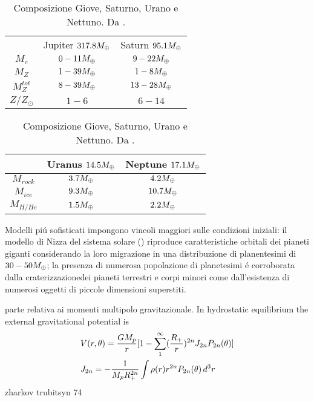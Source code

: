 \begin{table}[!htb]
    \begin{minipage}{.5\linewidth}
      \centering
        \begin{tabular}{|ccc|}
\hline
&\parbox{1.5cm}{Jupiter $317.8M_{\oplus}{}$}&\parbox{1.5cm}{Saturn $95.1M_{\oplus}{}$}\\
  $M_c$&$0-11M_{\oplus}{}$&$9-22M_{\oplus}{}$\\
\hline
$M_Z$&$1-39M_{\oplus}{}$&$1-8M_{\oplus}{}$\\
\hline
$M_Z^{tot}$&$8-39M_{\oplus}{}$&$13-28M_{\oplus}{}$\\
\hline
$Z/Z_{\odot}$&$1-6$&$6-14$\\
\hline
 \end{tabular}
    \end{minipage}%
    \begin{minipage}{.5\linewidth}
      \centering
        \begin{tabular}{|ccc|}
\hline
&\parbox{1.5cm}{Uranus $14.5M_{\oplus}{}$}&\parbox{1.5cm}{Neptune $17.1M_{\oplus}{}$}\\
\hline
$M_{rock}$&$3.7M_{\oplus}{}$&$4.2M_{\oplus}{}$\\
\hline
$M_{ice}$&$9.3M_{\oplus}{}$&$10.7M_{\oplus}{}$\\
\hline
$M_{H/He}$&$1.5M_{\oplus}{}$&$2.2M_{\oplus}{}$\\
\hline
        \end{tabular}
    \end{minipage} 
    \caption{Composizione Giove, Saturno, Urano e Nettuno. Da \cite{baraffe2009physical}.}\label{tab:JSUNcomp}
\end{table}

Modelli pi\'u sofisticati impongono vincoli maggiori sulle condizioni iniziali: il modello di Nizza del sistema solare (\cite{tsiganis2005origin}) riproduce caratteristiche orbitali dei pianeti giganti considerando la loro migrazione in una distribuzione di planentesimi di $30-50M_{\oplus}{}$; la presenza di numerosa popolazione di planetesimi \'e corroborata dalla craterizzazionedei pianeti terrestri e corpi minori come dall'esistenza di numerosi oggetti di piccole dimensioni superstiti.

\begin{workout}
parte relativa ai momenti multipolo gravitazionale. 
In hydrostatic equilibrium the external gravitational potential is
\begin{align}
&V(r,\theta)=\frac{GM_p}{r}[1-\sum_1^{\infty}(\frac{R_+}{r})^{2n}J_{2n}P_{2n}(\theta)]\\
&J_{2n}=-\frac{1}{M_pR_+^{2n}}\int\rho(r) r^{2n}P_{2n}(\theta)\,d^3r
\end{align}
zharkov trubitsyn 74
\end{workout}

